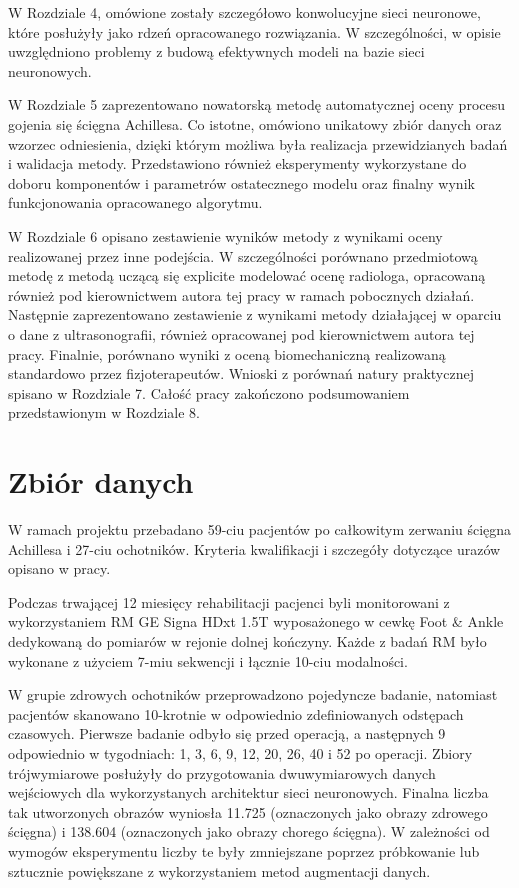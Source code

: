 W Rozdziale 4, omówione zostały szczegółowo konwolucyjne sieci neuronowe, które posłużyły jako rdzeń opracowanego rozwiązania. W szczególności, w opisie uwzględniono problemy z budową efektywnych modeli na bazie sieci neuronowych. 

W Rozdziale 5 zaprezentowano nowatorską metodę automatycznej oceny procesu gojenia się ścięgna Achillesa. Co istotne, omówiono unikatowy zbiór danych oraz wzorzec odniesienia, dzięki którym możliwa była realizacja przewidzianych badań i walidacja metody. Przedstawiono również eksperymenty wykorzystane do doboru komponentów i parametrów ostatecznego modelu oraz finalny wynik funkcjonowania opracowanego algorytmu. 

W Rozdziale 6 opisano zestawienie wyników metody z wynikami oceny realizowanej przez inne podejścia. W szczególności porównano przedmiotową metodę z metodą uczącą się explicite modelować ocenę radiologa, opracowaną również pod kierownictwem autora tej pracy w ramach pobocznych działań. Następnie zaprezentowano zestawienie z wynikami metody działającej w oparciu o dane z ultrasonografii, również opracowanej pod kierownictwem autora tej pracy. Finalnie, porównano wyniki z oceną biomechaniczną realizowaną standardowo przez fizjoterapeutów. Wnioski z porównań natury praktycznej spisano w Rozdziale 7. Całość pracy zakończono podsumowaniem przedstawionym w Rozdziale 8.

{\let\clearpage\relax\chapter*{Zbiór danych}}

W ramach projektu przebadano 59-ciu pacjentów po całkowitym zerwaniu ścięgna Achillesa i 27-ciu ochotników. Kryteria kwalifikacji i szczegóły dotyczące urazów opisano w pracy.

Podczas trwającej 12 miesięcy rehabilitacji pacjenci byli monitorowani z wykorzystaniem RM GE Signa HDxt 1.5T wyposażonego w cewkę Foot \& Ankle dedykowaną do pomiarów w rejonie dolnej kończyny. Każde z badań RM było wykonane z użyciem 7-miu sekwencji i łącznie 10-ciu modalności.

W grupie zdrowych ochotników przeprowadzono pojedyncze badanie, natomiast pacjentów skanowano 10-krotnie w odpowiednio zdefiniowanych odstępach czasowych. Pierwsze badanie odbyło się przed operacją, a następnych 9 odpowiednio w tygodniach: 1, 3, 6, 9, 12, 20, 26, 40 i 52 po operacji. Zbiory trójwymiarowe posłużyły do przygotowania dwuwymiarowych danych wejściowych dla wykorzystanych architektur sieci neuronowych. Finalna liczba tak utworzonych obrazów wyniosła 11.725 (oznaczonych jako obrazy zdrowego ścięgna) i 138.604 (oznaczonych jako obrazy chorego ścięgna). W zależności od wymogów eksperymentu liczby te były zmniejszane poprzez próbkowanie lub sztucznie powiększane z wykorzystaniem metod augmentacji danych.

